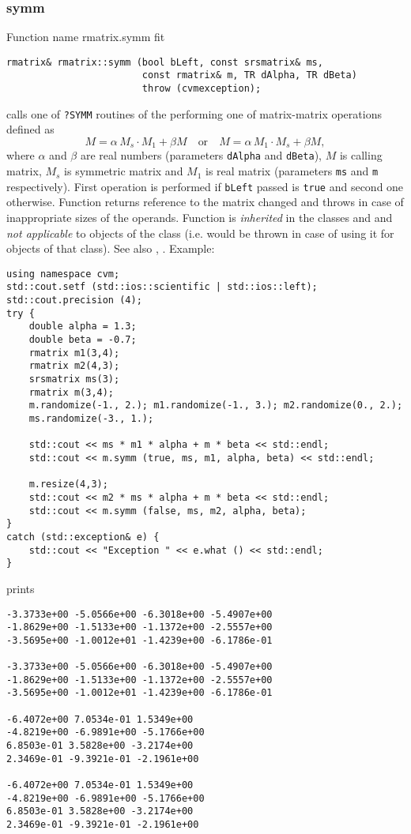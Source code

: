 \subsubsection{symm}
Function%
\pdfdest name {rmatrix.symm} fit
\begin{verbatim}
rmatrix& rmatrix::symm (bool bLeft, const srsmatrix& ms,
                        const rmatrix& m, TR dAlpha, TR dBeta)
                        throw (cvmexception);
\end{verbatim}
calls one of \verb"?SYMM" routines of the
performing one of
matrix-matrix operations defined as
\begin{equation*}
M=\alpha\,M_s\cdot M_1 + \beta M\quad\text{or}\quad M=\alpha\,M_1\cdot M_s + \beta M,
\end{equation*}
where $\alpha$ and $\beta$ are real numbers
(parameters \verb"dAlpha" and \verb"dBeta"),
$M$ is  calling matrix,
$M_s$ is  symmetric matrix and $M_1$
is  real matrix (parameters \verb"ms"
and \verb"m" respectively).
First operation is performed if \verb"bLeft" passed
is \verb"true" and second one otherwise.
Function
returns  reference to the matrix changed and throws
in case of inappropriate sizes of the operands.
Function is \emph{inherited} in the classes
 and
 and
\emph{not applicable} to objects of the class
 (i.e.  would be thrown
in case of using it for objects of that class).
See also ,
.
Example:
\begin{Verbatim}
using namespace cvm;
std::cout.setf (std::ios::scientific | std::ios::left);
std::cout.precision (4);
try {
    double alpha = 1.3;
    double beta = -0.7;
    rmatrix m1(3,4);
    rmatrix m2(4,3);
    srsmatrix ms(3);
    rmatrix m(3,4);
    m.randomize(-1., 2.); m1.randomize(-1., 3.); m2.randomize(0., 2.);
    ms.randomize(-3., 1.);

    std::cout << ms * m1 * alpha + m * beta << std::endl;
    std::cout << m.symm (true, ms, m1, alpha, beta) << std::endl;

    m.resize(4,3);
    std::cout << m2 * ms * alpha + m * beta << std::endl;
    std::cout << m.symm (false, ms, m2, alpha, beta);
}
catch (std::exception& e) {
    std::cout << "Exception " << e.what () << std::endl;
}
\end{Verbatim}
prints
\begin{Verbatim}
-3.3733e+00 -5.0566e+00 -6.3018e+00 -5.4907e+00
-1.8629e+00 -1.5133e+00 -1.1372e+00 -2.5557e+00
-3.5695e+00 -1.0012e+01 -1.4239e+00 -6.1786e-01

-3.3733e+00 -5.0566e+00 -6.3018e+00 -5.4907e+00
-1.8629e+00 -1.5133e+00 -1.1372e+00 -2.5557e+00
-3.5695e+00 -1.0012e+01 -1.4239e+00 -6.1786e-01

-6.4072e+00 7.0534e-01 1.5349e+00
-4.8219e+00 -6.9891e+00 -5.1766e+00
6.8503e-01 3.5828e+00 -3.2174e+00
2.3469e-01 -9.3921e-01 -2.1961e+00

-6.4072e+00 7.0534e-01 1.5349e+00
-4.8219e+00 -6.9891e+00 -5.1766e+00
6.8503e-01 3.5828e+00 -3.2174e+00
2.3469e-01 -9.3921e-01 -2.1961e+00
\end{Verbatim}

